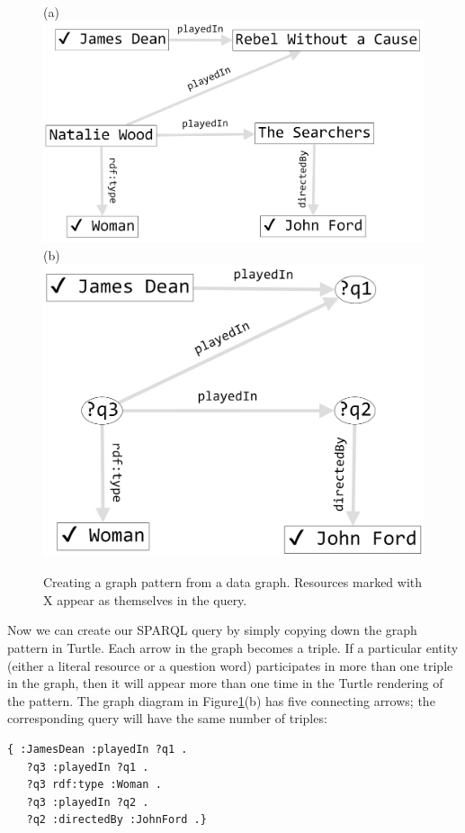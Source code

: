 \begin{figure}
\centering
(a)
\includegraphics[width=5in]{SWWOv3/media/ch6/figure6-7a.png}
(b)
\includegraphics[width=5in]{SWWOv3/media/ch6/figure6-7b.png}
\label{fig:ch6.7}
\caption{Creating a graph pattern from a data graph. Resources marked with X appear as themselves in the query.}
\end{figure}


Now we can create our SPARQL query by simply copying down the graph
pattern in Turtle. Each arrow in the graph becomes a triple. If a
particular entity (either a literal resource or a question word)
participates in more than one triple in the graph, then it will appear
more than one time in the Turtle rendering of the pattern. The graph
diagram in Figure\ref{fig:ch6.7}(b) has five connecting arrows; the corresponding
query will have the same number of triples:

\begin{lstlisting}
{ :JamesDean :playedIn ?q1 .
   ?q3 :playedIn ?q1 .
   ?q3 rdf:type :Woman .
   ?q3 :playedIn ?q2 .
   ?q2 :directedBy :JohnFord .}
\end{lstlisting}

